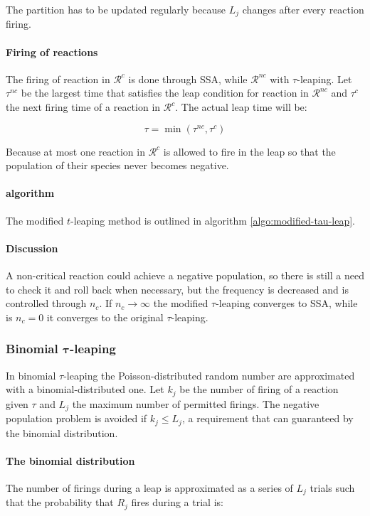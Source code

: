       The partition has to be updated regularly because $L_j$ changes after every reaction firing.

      \paragraph{Firing of reactions}
      The firing of reaction in $\mathcal{R}^{c}$ is done through SSA, while $\mathcal{R}^{nc}$ with $\tau$-leaping.
      Let $\tau^{nc}$ be the largest time that satisfies the leap condition for reaction in $\mathcal{R}^{nc}$ and $\tau^c$ the next firing time of a reaction in $\mathcal{R}^c$.
      The actual leap time will be:

      $$\tau = \min(\tau^{nc}, \tau^c)$$

      Because at most one reaction in $\mathcal{R}^c$ is allowed to fire in the leap so that the population of their species never becomes negative.

      \paragraph{algorithm}
      The modified $t$-leaping method is outlined in algorithm \ref{algo:modified-tau-leap}.

      

      \paragraph{Discussion}
      A non-critical reaction could achieve a negative population, so there is still a need to check it and roll back when necessary, but the frequency is decreased and is controlled through $n_c$.
      If $n_c\rightarrow\infty$ the modified $\tau$-leaping converges to SSA, while is $n_c=0$ it converges to the original $\tau$-leaping.

    \subsubsection{Binomial $\mathbf{\tau}$-leaping}
    In binomial $\tau$-leaping the Poisson-distributed random number are approximated with a binomial-distributed one.
    Let $k_j$ be the number of firing of a reaction given $\tau$ and $L_j$ the maximum number of permitted firings.
    The negative population problem is avoided if $k_j\le L_j$, a requirement that can guaranteed by the binomial distribution.

      \paragraph{The binomial distribution}
      The number of firings during a leap is approximated as a series of $L_j$ trials such that the probability that $R_j$ fires during a trial is:

